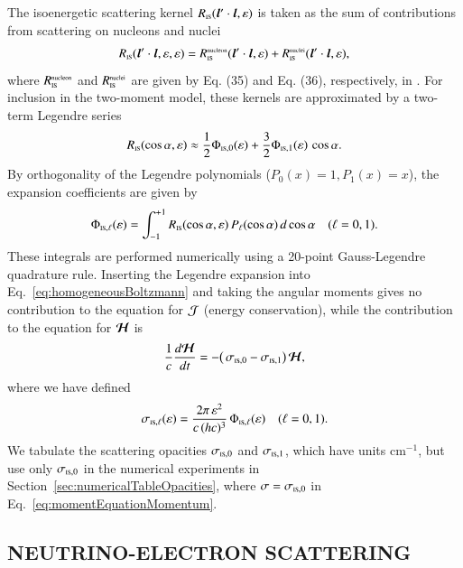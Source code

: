 \documentclass[11pt,letterpaper,twoside,english,final]{article}
\begin{document}
The isoenergetic scattering kernel $R_{\mbox{\tiny IS}}(\boldsymbol{l}'\cdot\boldsymbol{l},\varepsilon)$ is taken as the sum of contributions from scattering on nucleons and nuclei
\begin{equation}
  R_{\mbox{\tiny IS}}(\boldsymbol{l}'\cdot\boldsymbol{l},\varepsilon,\varepsilon) = R_{\mbox{\tiny IS}}^{\mbox{\tiny nucleon}}(\boldsymbol{l}'\cdot\boldsymbol{l},\varepsilon) + R_{\mbox{\tiny IS}}^{\mbox{\tiny nuclei}}(\boldsymbol{l}'\cdot\boldsymbol{l},\varepsilon),
\end{equation}
where $R_{\mbox{\tiny IS}}^{\mbox{\tiny nucleon}}$ and $R_{\mbox{\tiny IS}}^{\mbox{\tiny nuclei}}$ are given by Eq. (35) and Eq. (36), respectively, in \citet{mezzacappaBruenn_1993a}.  
For inclusion in the two-moment model, these kernels are approximated by a two-term Legendre series
\begin{align}
  R_{\mbox{\tiny IS}}(\cos\alpha,\varepsilon) \approx \frac{1}{2} \Phi_{\mbox{\tiny IS},0}(\varepsilon) + \frac{3}{2}\Phi_{\mbox{\tiny IS},1}(\varepsilon)\,\cos\alpha.
\end{align}
By orthogonality of the Legendre polynomials ($P_{0}(x)=1,P_{1}(x)=x$), the expansion coefficients are given by
\begin{equation}
  \Phi_{\mbox{\tiny IS},\ell}(\varepsilon)
  =\int_{-1}^{+1}R_{\mbox{\tiny IS}}(\cos\alpha,\varepsilon)\,P_{\ell}(\cos\alpha)\,d\cos\alpha \quad (\ell=0,1).  
\end{equation}
These integrals are performed numerically using a 20-point Gauss-Legendre quadrature rule.  
Inserting the Legendre expansion into Eq.~\eqref{eq:homogeneousBoltzmann} and taking the angular moments gives no contribution to the equation for $\mathcal{J}$ (energy conservation), while the contribution to the equation for $\boldsymbol{\mathcal{H}}$ is
\begin{equation}
  \frac{1}{c}\frac{d \boldsymbol{\mathcal{H}}}{d t}
  =-\big(\,\sigma_{\mbox{\tiny IS},0}-\sigma_{\mbox{\tiny IS},1}\big)\,\boldsymbol{\mathcal{H}},
\end{equation}
where we have defined
\begin{equation}
  \sigma_{\mbox{\tiny IS},\ell}(\varepsilon)
  =\frac{2\pi\,\varepsilon^{2}}{c\,(hc)^{3}}\,\Phi_{\mbox{\tiny IS},\ell}(\varepsilon) \quad (\ell=0,1).  
\end{equation}
We tabulate the scattering opacities $\sigma_{\mbox{\tiny IS},0}$ and $\sigma_{\mbox{\tiny IS},1}$, which have units cm$^{-1}$, but use only $\sigma_{\mbox{\tiny IS},0}$ in the numerical experiments in Section~\ref{sec:numericalTableOpacities}, where $\sigma=\sigma_{\mbox{\tiny IS},0}$ in Eq.~\eqref{eq:momentEquationMomentum}.  

\subsection{NEUTRINO-ELECTRON SCATTERING}
\end{document}
